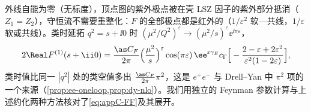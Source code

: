 外线自能为零（无标度），顶点图的紫外极点被在壳 LSZ 因子的紫外部分抵消（$Z_1=Z_2$），守恒流不需要重整化：$F$ 的全部极点都是红外的（$1/\varepsilon^2$ 软—共线，$1/\varepsilon$ 软或共线）。类时延拓 $q^2=s+\ii0$ 时 $(\mu^2/Q^2)^\varepsilon\to(\mu^2/s)^\varepsilon\ee^{\ii\pi\varepsilon}$，
\begin{equation}\label{eq:appC-FFtime}
2\Real F^{(1)}(s+\ii0)=\frac{\as C_F}{2\pi}\Big(\frac{\mu^2}{s}\Big)^{\varepsilon}\cos(\pi\varepsilon)\,\ee^{\varepsilon\gamma_E}c_\Gamma\Big[-\frac{2-\varepsilon+2\varepsilon^2}{\varepsilon^2(1-2\varepsilon)}\Big] ,
\end{equation}
类时值比同一 $|q^2|$ 处的类空值多出 $\frac{\as C_F}{2\pi}\pi^2$，这是 $e^+e^-$ 与 Drell--Yan 中 $\pi^2$ 项的一个来源（\cref{prop:ee-oneloop,prop:dy-nlo}）。我们用独立的 Feynman 参数计算与上述约化两种方法核对了\cref{eq:appC-FF}及其展开。
